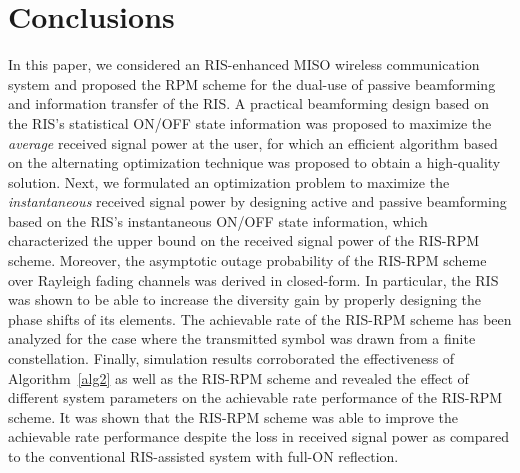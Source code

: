 \documentclass[draftclsnofoot,onecolumn,12pt]{IEEEtran}
\begin{document}
\section{Conclusions}\label{conclusion}
In this paper, we considered an RIS-enhanced MISO wireless communication system and proposed the RPM scheme for the dual-use of passive beamforming and information transfer of the RIS. 
A practical beamforming design based on the RIS's statistical ON/OFF state information was proposed to maximize the {\it average} received signal power at the user, 
for which an efficient algorithm based on the alternating optimization technique was proposed to obtain a high-quality solution. 
Next, we formulated an optimization problem to maximize the {\it instantaneous} received signal power by designing active and passive beamforming based on the RIS's instantaneous ON/OFF state information, which characterized the upper bound on the received signal power of the RIS-RPM scheme. 
Moreover, the asymptotic outage probability of the RIS-RPM scheme over Rayleigh fading channels was derived in closed-form. 
In particular, the RIS was shown to be able to increase the diversity gain by properly designing the phase shifts of its elements. 
The achievable rate of the RIS-RPM scheme has been analyzed for the case where the transmitted symbol was drawn from a finite constellation. 
Finally, simulation results corroborated the effectiveness of Algorithm~\ref{alg2} as well as the RIS-RPM scheme and revealed the effect of different system parameters on the achievable rate performance of the RIS-RPM scheme. 
It was shown that the RIS-RPM scheme was able to improve the achievable rate performance despite the loss in received signal power as compared to the conventional RIS-assisted system with full-ON reflection. 


\ifCLASSOPTIONcaptionsoff
  \newpage
\fi



\end{document}
